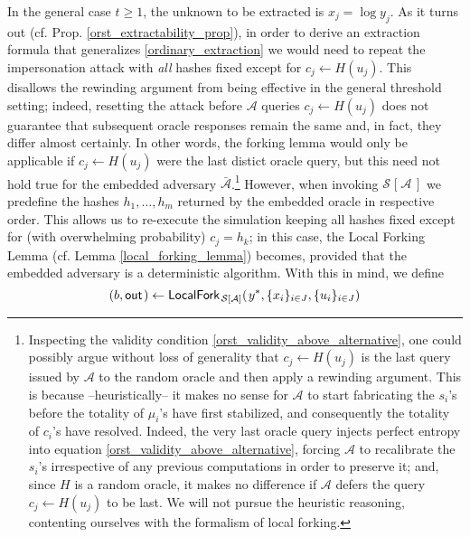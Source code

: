 \documentclass[psamsfonts, reqno]{amsart}
\theoremstyle{definition}
\theoremstyle{remark}
\numberwithin{equation}{section}
\begin{document}
In the general case $t \ge 1$,
the unknown to be extracted is $x_j = \log y_j$.
As it turns out (cf. Prop. \ref{orst_extractability_prop}),
in order to derive an extraction formula that generalizes
\eqref{ordinary_extraction}
we would need to repeat the impersonation attack
with \textit{all} hashes fixed except for
$c_j \leftarrow H(u_j)$.
This disallows the rewinding argument
from being effective in the general threshold setting;
indeed, resetting the attack before
$\mathcal{A}$ queries $c_j \leftarrow H(u_j)$ does not
guarantee that subsequent oracle responses remain the same
and, in fact, they differ almost certainly.
In other words, the forking lemma would only be
applicable if $c_j \leftarrow H(u_j)$ were the last distict
oracle query, but this need not hold true for the embedded
adversary $\mathcal{\bar{A}}$.\footnote{Inspecting
the validity condition \eqref{orst_validity_above_alternative},
one could possibly argue without loss of generality that
$c_j \leftarrow H(u_j)$ is
the last query issued by $\mathcal{A}$ to the random oracle
and then apply a rewinding argument.
This is because --heuristically--
it makes no sense for $\mathcal{A}$ to start fabricating the
$s_i$'s before the totality of $\mu_i$'s have first stabilized,
and consequently the totality of $c_i$'s have resolved.
Indeed, the very last oracle query injects perfect
entropy into equation \eqref{orst_validity_above_alternative},
forcing $\mathcal{A}$ to recalibrate the $s_i$'s
irrespective of any previous computations in order to preserve it;
and, since $H$ is a random oracle, it makes no difference
if $\mathcal{A}$ defers the query $c_j \leftarrow H(u_j)$
to be last. We will not pursue the heuristic reasoning,
contenting ourselves with the formalism of local forking.}
However, when invoking
$\mathcal{S}\hspace{1pt}[\hspace{1pt}\mathcal{A}\hspace{2pt}]$
we predefine the hashes $h_1, \dots, h_m$
returned by the embedded oracle in respective order. This allows
us to re-execute the simulation keeping all
hashes fixed except for (with overwhelming probability)
$c_j = h_k$; in this case, the Local Forking Lemma
(cf. Lemma \ref{local_forking_lemma}) becomes,
provided that the embedded adversary is a deterministic algorithm.
With this in mind, we define
\vspace{5pt}
\begin{equation*}
(\vspace{1pt}b,\vspace{1pt} \mathsf{out}\hspace{1pt}) \leftarrow
\textsf{LocalFork}_{
		\hspace{1pt}
    	\mathcal{S}\hspace{0pt}[
    		\hspace{0pt}
    		\mathcal{A}
    		\hspace{0pt}
    	]
    }
	(
   		\hspace{1pt}y^*,
    	\{x_i\}_{i \in J},
    	\{u_i\}_{i \in J}
   	)
\vspace{5pt}
\end{equation*}
\end{document}
